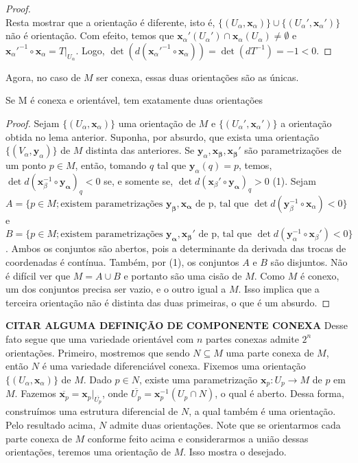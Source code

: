 \begin{proof}
\begin{equation*}
    \end{equation*}
    Resta mostrar que a orientação é diferente, isto é, $\{ (U_{\alpha}, \mathbf{x}_{\alpha}) \}\cup \{ (U_{\alpha}', \mathbf{x}_{\alpha}')\}$ não é orientação.  Com efeito, temos que $\mathbf{x}_{\alpha}'(U_{\alpha}')\cap \mathbf{x}_{\alpha}(U_{\alpha})\neq \emptyset$ e $\mathbf{x}_{\alpha}'^{-1}\circ \mathbf{x}_{\alpha}=T|_{U_{\alpha}}$. Logo, $\det(d(\mathbf{x}_{\alpha}'^{-1}\circ \mathbf{x}_{\alpha}))=\det (dT^{-1})=-1<0$.
\end{proof}
Agora, no caso de $M$ ser conexa, essas duas orientações são as únicas.
\begin{proposition}
    \label{loc:prop_5_:_se_m_é_conexa_e_orientável_tem_exatamente_duas_orientações.proposição}
    Se M é conexa e orientável, tem exatamente duas orientações
    \begin{proof}

        Sejam $\{ (U_{\alpha}, \mathbf{x}_{\alpha}) \}$ uma orientação de $M$ e $\{ (U_{\alpha}', \mathbf{x}_{\alpha}') \}$ a orientação obtida no lema anterior. Suponha, por absurdo, que exista uma orientação $\{ (V_{\alpha}, \mathbf{y}_{\alpha}) \}$ de $M$ distinta das anteriores. Se $\mathbf{y}_{\alpha}, \mathbf{x_{\beta}, \mathbf{x}_{\beta}'}$ são parametrizações de um ponto $p \in M$, então, tomando $q$ tal que $\mathbf{y}_{\alpha}(q)=p$, temos, $\det d(\mathbf{x}_{\beta}^{-1} \circ \mathbf{y_{\alpha}})_{q}<0$ se, e somente se, $\det d(\mathbf{x}_{\beta}'\circ \mathbf{y_{\alpha}})_{q}>0$ (1).
        Sejam $A=\{ p \in M; \text{existem parametrizações } \mathbf{y_{\beta}} , \mathbf{x_{\alpha}} \text{  de p, tal que }\det d(\mathbf{y}_{\beta}^{-1} \circ \mathbf{x}_{\alpha})<0\}$ e $B=\{ p \in M; \text{existem parametrizações } \mathbf{y_{\alpha}} , \mathbf{x_{\beta}'} \text{  de p, tal que }\det d(\mathbf{y}_{\alpha}^{-1} \circ \mathbf{x}_{\beta}')<0\}$.
        Ambos os conjuntos são abertos, pois a determinante da derivada das trocas de coordenadas é contínua. Também, por (1), os conjuntos $A$ e $B$ são disjuntos. Não é difícil ver que $M=A \cup B$ e portanto são uma cisão de $M$. Como $M$ é conexo, um dos conjuntos precisa ser vazio, e o outro igual a $M$. Isso implica que a terceira orientação não é distinta das duas primeiras, o que é um absurdo.
    \end{proof}
\end{proposition}
\textbf{CITAR ALGUMA DEFINIÇÃO DE COMPONENTE CONEXA}
Desse fato segue que uma variedade orientável com $n$ partes conexas admite $2^{n}$ orientações. Primeiro, mostremos que sendo $N \subseteq M$ uma parte conexa de $M$, então $N$ é uma variedade diferenciável conexa. Fixemos uma orientação $\{ (U_{\alpha}, \mathbf{x}_{\alpha}) \}$ de $M$. Dado $p \in N$, existe uma parametrização $\mathbf{x}_{p}:U_{p}\to M$ de $p$ em $M$. Fazemos $\overline{\mathbf{x}_{p}}=\mathbf{x}_{p}|_{\overline{U_{p}}}$, onde $\overline{U_{p}}=\mathbf{x}_{p}^{-1}(U_{p}\cap N)$, o qual é aberto. Dessa forma, construímos uma estrutura diferencial de $N$, a qual também é uma orientação. Pelo resultado acima, $N$ admite duas orientações. Note que se orientarmos cada parte conexa de $M$ conforme feito acima e considerarmos a união dessas orientações, teremos uma orientação de $M$. Isso mostra o desejado.

